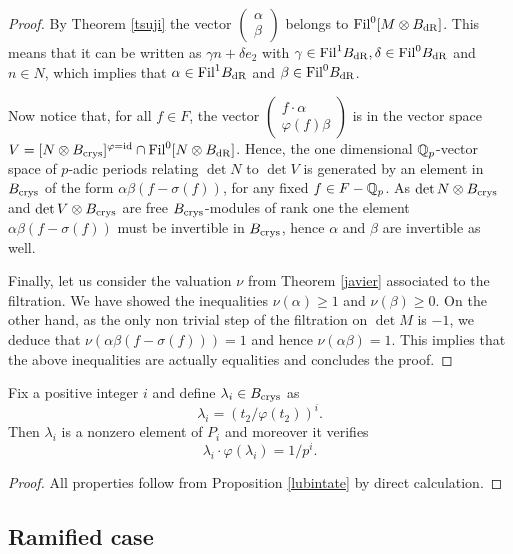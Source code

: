 \documentclass[11pt]{amsart}
\begin{document}
\begin{proof}
  By Theorem \ref{tsuji} the vector $\begin{pmatrix} \alpha \\
\beta
 \end{pmatrix}$ belongs to $\textnormal{Fil}^0[M \otimes B_{\mathrm{dR}}]$. This means that it can be written as $\gamma n + \delta e_2$ with $\gamma \in \textnormal{Fil}^{1}B_{\mathrm{dR}}, \delta \in \textnormal{Fil}^0 B_{\mathrm{dR}}$ and $n \in N$, which implies that $\alpha \in \textnormal{Fil}^{1}B_{\mathrm{dR}}$ and  $\beta \in \textnormal{Fil}^{0}B_{\mathrm{dR}}$. 
  
  Now notice that, for all $f\in F$, the vector $\begin{pmatrix} f\cdot \alpha \\
\varphi(f)\beta
 \end{pmatrix}$ is in the vector space $V=[N\otimes B_{\textnormal{crys}}]^{\varphi=\mathrm{id}} \cap  \textnormal{Fil}^0[N \otimes B_{\mathrm{dR}}] $. Hence,  the one dimensional $\mathbb{Q}_p$-vector space of $p$-adic periods relating $\det N$ to $\det V$ is generated by an element in $B_{\textnormal{crys}}$ of the form $\alpha \beta (f-\sigma( f) )$, for any fixed $f \in F- \mathbb{Q}_p$. As $\det N\otimes B_{\textnormal{crys}}$ and $\det V\otimes B_{\textnormal{crys}}$ are free $B_{\textnormal{crys}}$-modules of rank one the element $\alpha \beta (f-\sigma( f) )$ must be invertible in $B_{\textnormal{crys}}$, hence $\alpha$ and  $\beta$ are invertible as well.
 
Finally, let us consider the  valuation $\nu$ from Theorem \ref{javier} associated to the filtration. We have showed the inequalities $\nu ( \alpha) \geq 1$ and  $\nu (  \beta)\geq 0$.
On the other hand, as the only non trivial step of the filtration on $\det M$ is  $-1$, we deduce that $\nu ( \alpha \beta (f-\sigma( f) ))=1$ and hence $\nu ( \alpha \beta)=1$. This implies  that the above inequalities are actually equalities and concludes the proof.
 \end{proof}
\begin{corollary}\label{brinon}
Fix a positive integer $i$ and define $\lambda_i \in B_{\textnormal{crys}}$ as
\[\lambda_i = (t_2/\varphi(t_2))^i .\]
Then $\lambda_i$ is a nonzero element of  $P_i$ and moreover it verifies
\[\lambda_i \cdot\varphi(\lambda_i) = 1/p^i.\] 
\end{corollary}
\begin{proof}
All properties follow from Proposition \ref{lubintate} by direct calculation.
\end{proof}


\subsection*{Ramified case}\label{ramcase}
\end{document}
